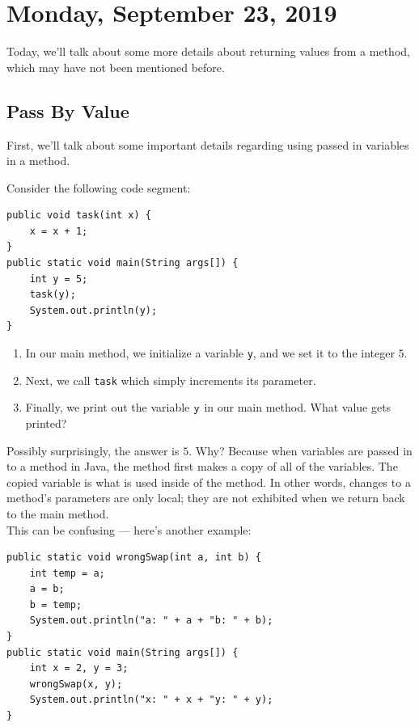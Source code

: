 \section{Monday, September 23, 2019}

Today, we'll talk about some more details about returning values from a method, which may have not been mentioned before.

\subsection{Pass By Value}

First, we'll talk about some important details regarding using passed in variables in a method.


Consider the following code segment:

\begin{lstlisting}
public void task(int x) {
    x = x + 1;
}
public static void main(String args[]) {
    int y = 5;
    task(y);
    System.out.println(y);
}
\end{lstlisting}

\begin{enumerate}
    \item In our main method, we initialize a variable \verb!y!, and we set it to the integer $5$. 
    \item Next, we call \verb!task! which simply increments its parameter. 
    \item Finally, we print out the variable $\verb!y!$ in our main method. What value gets printed? 
\end{enumerate}

Possibly surprisingly, the answer is $5$. Why? Because when variables are passed in to a method in Java, the method first makes a copy of all of the variables. The copied variable is what is used inside of the method. In other words, changes to a method's parameters are only local; they are not exhibited when we return back to the main method. \\


This can be confusing --- here's another example:

\begin{lstlisting}
public static void wrongSwap(int a, int b) {
    int temp = a;
    a = b;
    b = temp;
    System.out.println("a: " + a + "b: " + b);
}
public static void main(String args[]) {
    int x = 2, y = 3;
    wrongSwap(x, y);
    System.out.println("x: " + x + "y: " + y);
}
\end{lstlisting}

